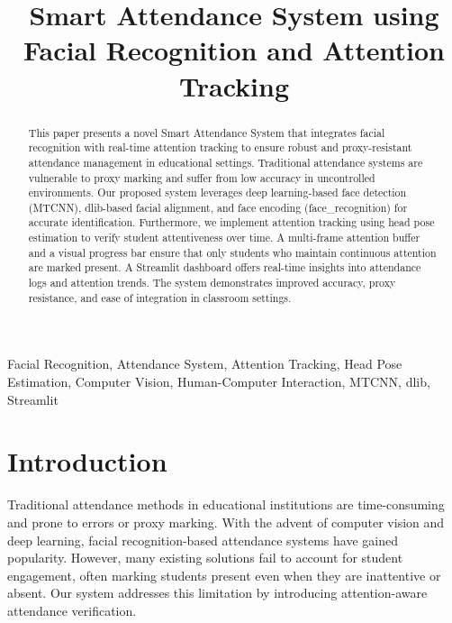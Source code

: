 \documentclass[conference]{IEEEtran}
\begin{document}
\title{Smart Attendance System using Facial Recognition and Attention Tracking}

\author{
\and
{}
}

\maketitle

\begin{abstract}
This paper presents a novel Smart Attendance System that integrates facial recognition with real-time attention tracking to ensure robust and proxy-resistant attendance management in educational settings. Traditional attendance systems are vulnerable to proxy marking and suffer from low accuracy in uncontrolled environments. Our proposed system leverages deep learning-based face detection (MTCNN), dlib-based facial alignment, and face encoding (face\_recognition) for accurate identification. Furthermore, we implement attention tracking using head pose estimation to verify student attentiveness over time. A multi-frame attention buffer and a visual progress bar ensure that only students who maintain continuous attention are marked present. A Streamlit dashboard offers real-time insights into attendance logs and attention trends. The system demonstrates improved accuracy, proxy resistance, and ease of integration in classroom settings.
\end{abstract}

\begin{IEEEkeywords}
Facial Recognition, Attendance System, Attention Tracking, Head Pose Estimation, Computer Vision, Human-Computer Interaction, MTCNN, dlib, Streamlit
\end{IEEEkeywords}

\section{Introduction}
Traditional attendance methods in educational institutions are time-consuming and prone to errors or proxy marking. With the advent of computer vision and deep learning, facial recognition-based attendance systems have gained popularity. However, many existing solutions fail to account for student engagement, often marking students present even when they are inattentive or absent. Our system addresses this limitation by introducing attention-aware attendance verification.
\end{document}
